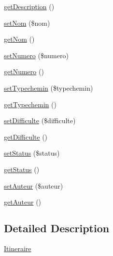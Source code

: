 \begin{DoxyCompactItemize}
\item 
\hyperlink{class_site_1_1_trail_bundle_1_1_entity_1_1_itineraire_a2e7bb35c71bf1824456ceb944cb7a845}{get\+Description} ()
\item 
\hyperlink{class_site_1_1_trail_bundle_1_1_entity_1_1_itineraire_a3c162f28ffbb9c8026c0d84f722e5060}{set\+Nom} (\$nom)
\item 
\hyperlink{class_site_1_1_trail_bundle_1_1_entity_1_1_itineraire_a184f2299ee4553fa0782ea87c9aed362}{get\+Nom} ()
\item 
\hyperlink{class_site_1_1_trail_bundle_1_1_entity_1_1_itineraire_a06e8a86c925ab97b417a90775cc269f7}{set\+Numero} (\$numero)
\item 
\hyperlink{class_site_1_1_trail_bundle_1_1_entity_1_1_itineraire_aac837c7f73ec485f8ddc6118e6f5c15f}{get\+Numero} ()
\item 
\hyperlink{class_site_1_1_trail_bundle_1_1_entity_1_1_itineraire_a1b7080511210ba19f0c042535108c001}{set\+Typechemin} (\$typechemin)
\item 
\hyperlink{class_site_1_1_trail_bundle_1_1_entity_1_1_itineraire_a7de18fdb40d2cb01f975c8727e59b213}{get\+Typechemin} ()
\item 
\hyperlink{class_site_1_1_trail_bundle_1_1_entity_1_1_itineraire_aab5d163c380c212455a1fd7d85b019eb}{set\+Difficulte} (\$difficulte)
\item 
\hyperlink{class_site_1_1_trail_bundle_1_1_entity_1_1_itineraire_a5170c489ed593dcdd0761307a2b89327}{get\+Difficulte} ()
\item 
\hyperlink{class_site_1_1_trail_bundle_1_1_entity_1_1_itineraire_a7d02c100d684fe1dffc6cb3486a48511}{set\+Status} (\$status)
\item 
\hyperlink{class_site_1_1_trail_bundle_1_1_entity_1_1_itineraire_a9d21636071f529e2154051d3ea6e5921}{get\+Status} ()
\item 
\hyperlink{class_site_1_1_trail_bundle_1_1_entity_1_1_itineraire_a6052b83867f252b19212adf8737addc4}{set\+Auteur} (\$auteur)
\item 
\hyperlink{class_site_1_1_trail_bundle_1_1_entity_1_1_itineraire_ad9cbe4cd4561e831bf6a59bdf8571a3b}{get\+Auteur} ()
\end{DoxyCompactItemize}


\subsection{Detailed Description}
\hyperlink{class_site_1_1_trail_bundle_1_1_entity_1_1_itineraire}{Itineraire}

